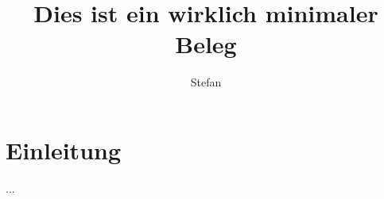 \documentclass[thesis=paper]{hsmw-thesis}
\title{Dies ist ein wirklich minimaler Beleg}
\author{Stefan}{Schildbach}[M.Sc.]
\begin{document}
	\chapter{Einleitung}
	...
\end{document}
